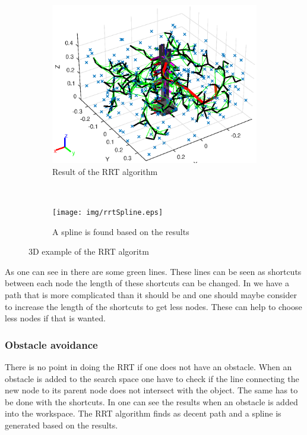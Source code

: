 \def\picsSiz{1.08}
\begin{figure}[htbp]
    \centering
    \begin{subfigure}[htbp]{0.45\textwidth}
        \centering
        \includegraphics[width = \picsSiz\linewidth]{img/rrt3dex.eps}
        \caption{Result of the RRT algorithm}
        \label{fig:rrt3dex}
    \end{subfigure}
    ~ 
    \begin{subfigure}[htbp]{0.45\textwidth}
        \centering
        \texttt{[image: img/rrtSpline.eps]}
        \caption{A spline is found based on the results}
        \label{fig:rrtSpline}
    \end{subfigure}
    \caption{3D example of the RRT algoritm}
    \label{fig:rrtsuper}
\end{figure}
 As one can see in  there are some green lines. These lines can be seen as shortcuts between each node the length of these shortcuts can be changed. In  we have a path that is more complicated than it should be and one should maybe consider to increase the length of the shortcuts to get less nodes. These can help to choose less nodes if that is wanted.
 
 \subsubsection{Obstacle avoidance}
 There is no point in doing the RRT if one does not have an obstacle. When an obstacle is added to the search space one have to check if the line connecting the new node to its parent node does not intersect with the object. The same has to be done with the shortcuts. In  one can see the results when an obstacle is added into the workspace. The RRT algorithm finds as decent path and a spline is generated based on the results. 

